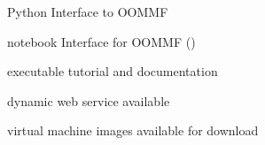 \begin{workpackage}
\begin{wpdelivs}
  \begin{wpdeliv}[due=9,id=oommf-py,dissem=PU,nature=O]
      {Python Interface to OOMMF}
\end{wpdeliv}
  \begin{wpdeliv}[due=15,id=oommf-nb,dissem=PU,nature=DEM]
      {\Jupyter notebook Interface for OOMMF (\OOMMFNB{})}
\end{wpdeliv}
  \begin{wpdeliv}[due=21,id=oommf-nb-documentation,dissem=PU,nature=DEC]
      {\OOMMFNB{} executable tutorial and documentation}
\end{wpdeliv}
  \begin{wpdeliv}[due=24,id=oommf-nb-tmp,dissem=PU,nature=DEC]
      {\OOMMFNB{} dynamic web service available}
\end{wpdeliv}
  \begin{wpdeliv}[due=24,id=oommf-nb-virtual,dissem=PU,nature=O]
      {\OOMMFNB{} virtual machine images available for download}
  \end{wpdeliv}
\end{wpdelivs}
\end{workpackage}


